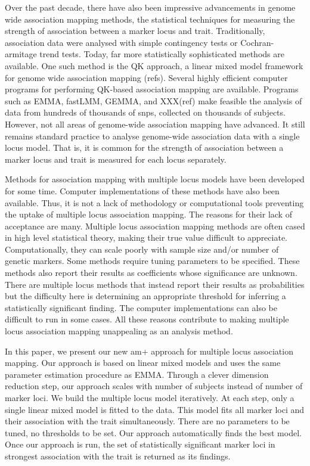 \documentclass{article}
\begin{document}
Over the past decade, there have also been impressive advancements in genome wide 
association mapping methods, the statistical techniques for measuring the strength of 
association between a marker locus and trait. Traditionally, association data were 
analysed with simple contingency tests or Cochran-armitage  trend tests. Today, far 
more statistically sophisticated methods are available. One such method is the  QK 
approach, a linear mixed model framework for genome wide association 
mapping (refs).  Several highly efficient computer programs for performing QK-based 
association mapping are available. Programs such as EMMA, fastLMM, GEMMA, and 
XXX(ref) make feasible the analysis of data from hundreds of thousands of snps, collected 
on thousands of subjects. However, not all areas of genome-wide association 
mapping have advanced. It still remains standard practice to analyse genome-wide 
association data with a single locus model. That is,  it is common for the strength of 
association between a marker locus and trait is measured for each locus separately. 

Methods for association mapping with multiple locus models have been developed 
for some time. Computer implementations of these methods have also been available. 
Thus, it is not a lack of methodology  or computational tools preventing the uptake of 
multiple locus association mapping. The reasons for their lack of acceptance are many. 
Multiple locus association mapping methods are often cased in high level statistical theory, 
making their true value difficult to appreciate.  Computationally, they can scale poorly with 
sample size and/or number of genetic markers. Some methods require tuning parameters 
to be specified. These methods also report their results as coefficients whose significance 
are unknown. There are multiple locus methods that instead report their results as probabilities 
but the difficulty here is determining  an appropriate threshold for inferring a statistically 
significant finding. The computer implementations can also be difficult to run in some cases. 
All these reasons contribute to making multiple locus association mapping unappealing as 
an analysis method.

In this paper, we present our new am+ approach for multiple locus association mapping. 
Our approach is based on linear mixed models and uses the same parameter estimation 
procedure as EMMA. Through a clever dimension reduction step, our approach scales 
with number of subjects instead of number of marker loci. We build the multiple locus 
model iteratively. At each step, only a single linear mixed model is fitted to the data. 
This model fits all marker loci and their association with the trait simultaneously. There 
are no parameters to be tuned, no thresholds to be set. Our approach automatically 
finds the best model. Once our approach is run, the set of statistically significant 
marker loci in strongest association with the trait is returned as its findings.  
\end{document}
